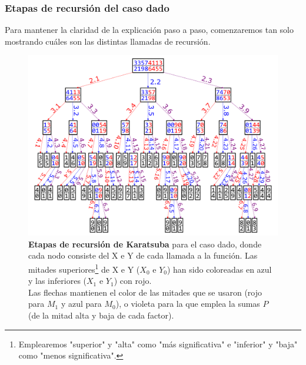 \documentclass[titlepage,a4paper]{article}
\begin{document}
\subsubsection{Etapas de recursión del caso dado}
Para mantener la claridad de la explicación paso a paso, comenzaremos tan solo mostrando cuáles son las distintas llamadas de recursión.

\begin{figure}[H]
\centering
\includegraphics[width=\textwidth,angle=90,origin=c]{KaratsubaArbol.png}
\caption{\label{fig:etapas}\textbf{Etapas de recursión de Karatsuba} para el caso dado,
donde cada nodo consiste del X e Y de cada llamada a la función. 
Las mitades superiores\footnote{Emplearemos "superior" y "alta" como "más significativa"
 e "inferior" y "baja" como "menos significativa".}
 de X e Y ($X_0$ e $Y_0$) han sido coloreadas en azul y las inferiores ($X_1$ e $Y_1$) con rojo.\\
Las flechas mantienen el color de las mitades que se usaron (rojo para $M_1$ y azul para $M_0$),
o violeta para la que emplea la sumas $P$ (de la mitad alta y baja de cada factor).}
 \end{figure}
\end{document}
